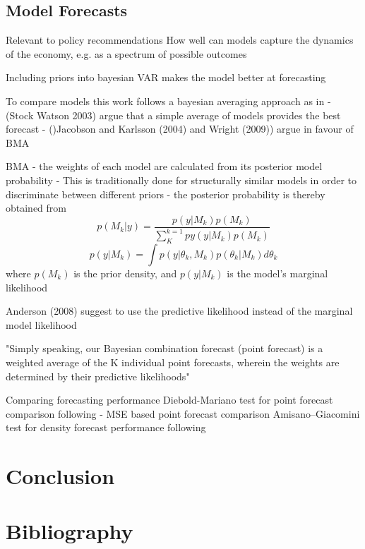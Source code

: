 \documentclass[12pt,a4paper,english]{article} %
\let\oldsection\section
\renewcommand\section{\clearpage\oldsection}
\begin{document}
	
	\subsection{Model Forecasts}
	Relevant to policy recommendations
	How well can models capture the dynamics of the economy, e.g. as a spectrum of possible outcomes
	
	Including priors into bayesian VAR makes the model better at forecasting \cite{chin_bayesian_2019}
	
	
	To compare models this work follows a bayesian averaging approach as in \cite{chin_bayesian_2019}
	- (Stock Watson 2003) argue that a simple average of models provides the best forecast
	- ()Jacobson and Karlsson (2004) and Wright (2009)) argue in favour of BMA
	
	
	BMA
	- the weights of each model are calculated from its posterior model probability \cite{chin_bayesian_2019}
	- This is traditionally done for structurally similar models in order to discriminate between different priors
	- the posterior probability is thereby obtained from \cite{chin_bayesian_2019}
	\[
		p(M_k | y) = \frac{p(y | M_k) p(M_k)}{\sum_{K}^{k=1} py(y | M_k) p(M_k)}
	\]
	\[
		p(y | M_k) = \int p( y| \theta_k, M_k) p(\theta_k | M_k) d \theta_k
	\]
	where $p(M_k)$ is the prior density, and $p(y | M_k)$ is the model's marginal likelihood
	
	Anderson (2008) suggest to use the predictive likelihood instead of the marginal model likelihood
	
	"Simply speaking, our Bayesian combination forecast (point forecast) is a weighted average of the K individual point forecasts, wherein the weights are determined by their predictive likelihoods" \cite{chin_bayesian_2019}
	
	Comparing forecasting performance
	Diebold-Mariano test for point forecast comparison following \cite{chin_bayesian_2019}
	- MSE based point forecast comparison 
	Amisano–Giacomini test for density forecast performance following  \cite{chin_bayesian_2019}

	
	\section{Conclusion}
	
	
	\section*{Bibliography}
	
	
\end{document}
